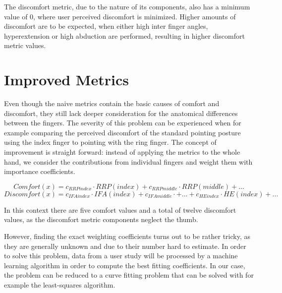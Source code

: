 The discomfort metric, due to the nature of its components, also has a minimum value of 0, where user perceived discomfort is minimized. Higher amounts of discomfort are to be expected, when either high inter finger angles, hyperextension or high abduction are performed, resulting in higher discomfort metric values. 

\section{Improved Metrics}

Even though the naive metrics contain the basic causes of comfort and discomfort, they still lack deeper consideration for the anatomical differences between the fingers. The severity of this problem can be experienced when for example comparing the perceived discomfort of the standard pointing posture using the index finger to pointing with the ring finger.
The concept of improvement is straight forward: instead of applying the metrics to the whole hand, we consider the contributions from individual fingers and weight them with importance coefficients. 


	\[
	Comfort(x) = c_{RRPindex}\cdot RRP(index) + c_{RRPmiddle}\cdot RRP(middle) + ...
	\]
	\[
	Discomfort(x) = c_{IFAindex}\cdot IFA(index)  +  c_{IFAmiddle}\cdot + ... + c_{HEindex}\cdot HE(index) + ...
	\]
	\vspace{5pt}


In this context there are five comfort values and a total of twelve discomfort values, as the discomfort metric components neglect the thumb. 

However, finding the exact weighting coefficients turns out to be rather tricky, as they are generally unknown and due to their number hard to estimate. In order to solve this problem, data from a user study will be processed by a machine learning algorithm in order to compute the best fitting coefficients. In our case, the problem can be reduced to a curve fitting problem that can be solved with for example the least-squares algorithm.